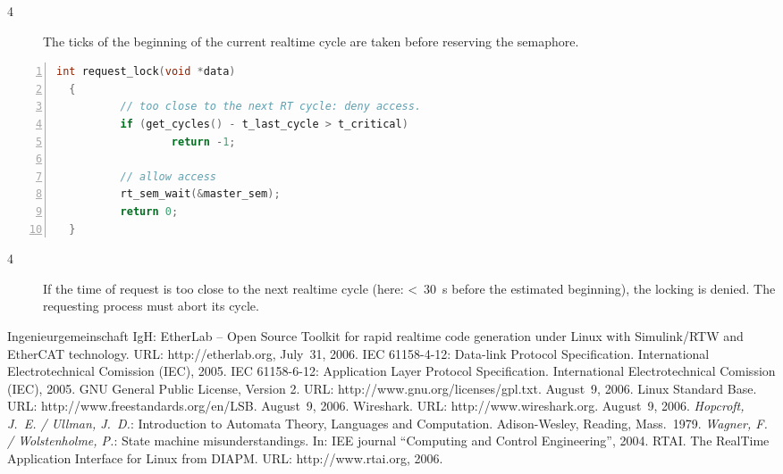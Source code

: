 \documentclass[a4paper,12pt,BCOR6mm,bibtotoc,idxtotoc]{scrbook}
\renewcommand\nomname{Glossary}
\begin{document}
\begin{description}
\item[\normalfont\textcircled{\tiny 4}] The ticks of the beginning of
  the current realtime cycle are taken before reserving the semaphore.
\end{description}

\begin{lstlisting}[language=C,numbers=left,caption={Request callback
    for reduced jitter},label={lst:redreq}]
  int request_lock(void *data)
  {
          // too close to the next RT cycle: deny access.
          if (get_cycles() - t_last_cycle > t_critical)
                  return -1;

          // allow access
          rt_sem_wait(&master_sem);
          return 0;
  }
\end{lstlisting}

\begin{description}
\item[\normalfont\textcircled{\tiny 4}] If the time of request is too
  close to the next realtime cycle (here: \textless~$30$~\textmu s
  before the estimated beginning), the locking is denied. The
  requesting process must abort its cycle.
\end{description}


\begin{thebibliography}{99}
 Ingenieurgemeinschaft IgH: EtherLab -- Open Source
  Toolkit for rapid realtime code generation under Linux with
  Simulink/RTW and EtherCAT technology. URL: http://etherlab.org,
  July~31, 2006.
 IEC 61158-4-12: Data-link Protocol Specification.
  International Electrotechnical Comission (IEC), 2005.
 IEC 61158-6-12: Application Layer Protocol
  Specification. International Electrotechnical Comission (IEC), 2005.
 GNU General Public License, Version 2. URL:
  http://www.gnu.org/licenses/gpl.txt. August~9, 2006.
 Linux Standard Base. URL:
  http://www.freestandards.org/en/LSB. August~9, 2006.
 Wireshark. URL: http://www.wireshark.org.
  August~9, 2006.
 {\it Hopcroft, J.~E. / Ullman, J.~D.}: Introduction
  to Automata Theory, Languages and Computation. Adison-Wesley,
  Reading, Mass.~1979.
 {\it Wagner, F. / Wolstenholme, P.}: State machine
  misunderstandings. In: IEE journal ``Computing and Control
  Engineering'', 2004.
 RTAI. The RealTime Application Interface for Linux from
  DIAPM. URL: http://www.rtai.org, 2006.
\end{thebibliography}

\printglossary
\addcontentsline{toc}{chapter}{\nomname}
\markleft{\nomname}

\printindex
{}

\end{document}
